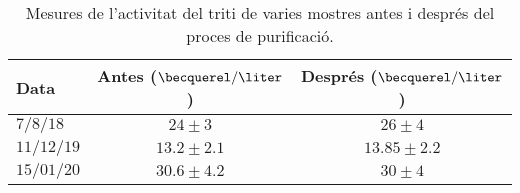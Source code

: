 \begin{table}[htbp]
\centering{}%
\begin{tabular}{lcc}
\toprule 
Data & Antes ($\becquerel/\liter$) & Després ($\becquerel/\liter$) \tabularnewline
\midrule
\midrule 
$7/8/18$ & $24 \pm 3$ & $26 \pm 4$ \tabularnewline
$11/12/19$ & $13.2 \pm 2.1$ & $13.85 \pm 2.2$ \tabularnewline
$15/01/20$ & $30.6 \pm 4.2$ & $30 \pm 4$ \tabularnewline
\bottomrule
\end{tabular}
\caption{Mesures de l'activitat del triti de varies mostres antes i després del proces de purificació.}
\label{tab:ValorsActivitatTriti}
\end{table}


